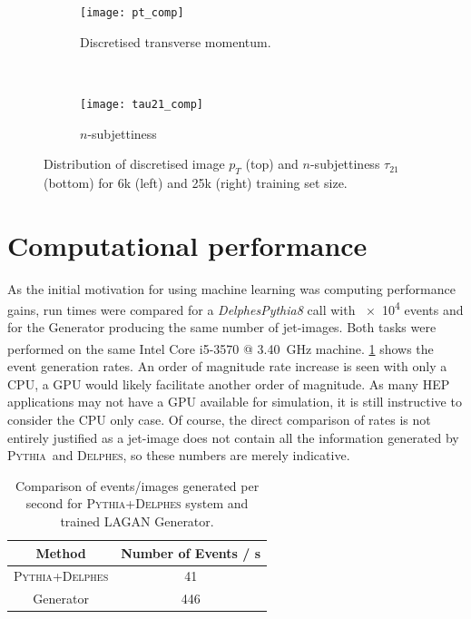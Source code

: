 \documentclass{report}
\newcommand{\pkg}[1]{\textsc{#1}}
\newcommand{\pythia}{\pkg{Pythia}}
\newcommand{\delphes}{\pkg{Delphes}}
\begin{document}
\begin{figure}[H]
	\centering
	\begin{subfigure}[t]{1.0\linewidth}
	\centering
	\texttt{[image: pt\_comp]}

	\caption{Discretised transverse momentum.}
	\label{fig:pt_comp}
	\end{subfigure}%
	\\
	\begin{subfigure}[t]{1.0\linewidth}
		\centering
		\texttt{[image: tau21\_comp]}
		\caption{$n$-subjettiness}
		\label{fig:tau21_comp}
	\end{subfigure}
	\caption{Distribution of discretised image $p_T$ (top) and $n$-subjettiness $\tau_{21}$ (bottom) for 6k (left) and 25k (right) training set size.}
	\label{fig:phys}
\end{figure}


\section{Computational performance}
\label{sec:comp}

As the initial motivation for using machine learning was computing performance gains, run times were compared for a \textit{DelphesPythia8} call with \num{e4} events and for the Generator producing the same number of jet-images. Both tasks were performed on the same Intel\textsuperscript{\textregistered} Core\textsuperscript{\texttrademark} i5-3570 @ \SI{3.40}{\giga\hertz} machine. \cref{tab:speed} shows the event generation rates. An order of magnitude rate increase is seen with only a CPU, a GPU would likely facilitate another order of magnitude. As many HEP applications may not have a GPU available for simulation, it is still instructive to consider the CPU only case. Of course, the direct comparison of rates is not entirely justified as a jet-image does not contain all the information generated by \pythia~and \delphes, so these numbers are merely indicative.

\begin{table}[H]
	\centering
	\begin{tabular}{cc}
		\toprule Method  & Number of Events / \si{\second} \\
		\midrule \pythia+\delphes  & 41\\
		\midrule Generator  & 446\\
		
		\bottomrule
	\end{tabular}
	\caption{Comparison of events/images generated per second for \pkg{Pythia}+\pkg{Delphes} system and trained LAGAN Generator.}
	\label{tab:speed}
\end{table}
	
\end{document}

